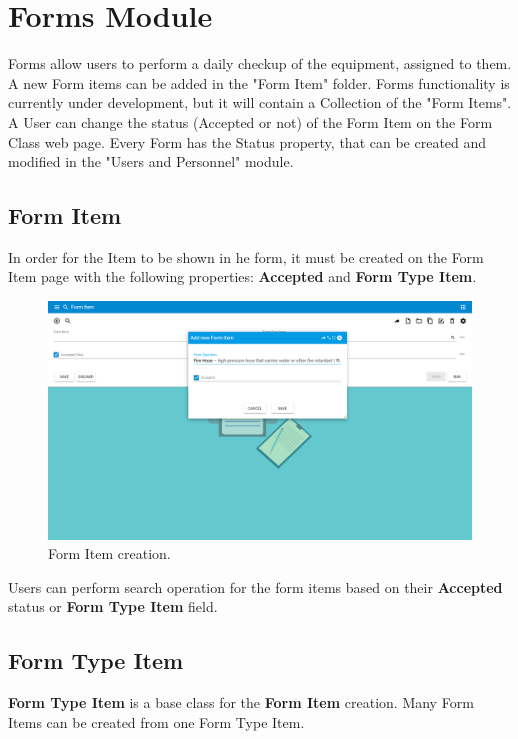 \section{Forms Module}\label{sec:01}

Forms allow users to perform a daily checkup of the equipment, assigned to them. A new Form items can be added in the "Form Item" folder. Forms functionality is currently under development, but it will contain a Collection of the "Form Items". A User can change the status (Accepted or not) of the Form Item on the Form Class web page. Every Form has the Status property, that can be created and modified in the "Users and Personnel" module.

\subsection{Form Item}
In order for the Item to be shown in he form, it must be created on the Form Item page with the following properties: \textbf{Accepted} and \textbf{Form Type Item}.

    \begin{figure}[!htbp]
    \centering
    \includegraphics[width=0.95\linewidth]{sections/forms/images/add_new_form_item.png}
    \caption{Form Item creation.}\label{sections/forms/images/add_new_form_item}
    \end{figure}

Users can perform search operation for the form items based on their \textbf{Accepted} status or \textbf{Form Type Item} field.
\newpage

\subsection{Form Type Item}
\textbf{Form Type Item} is a base class for the \textbf{Form Item} creation. Many Form Items can be created from one Form Type Item. 

